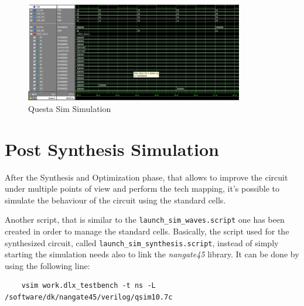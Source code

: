 \begin{figure}[H]   
	\centering
	\includegraphics[width=0.85\textwidth]{chapters/8_TestingVerification/images/simulation.png}
	\caption{Questa Sim Simulation}
	\label{fig:simulation}
\end{figure}

\section{Post Synthesis Simulation}
After the Synthesis and Optimization phase, that allows to improve the circuit under multiple points of view and perform the tech mapping, it's possible to simulate the behaviour of the circuit using the standard cells.

Another script, that is similar to the \texttt{launch\_sim\_waves.script} one has been created in order to manage the standard cells. Basically, the script used for the synthesized circuit, called \texttt{launch\_sim\_synthesis.script}, instead of simply starting the simulation needs also to link the \textit{nangate45} library. It can be done by using the following line:
\begin{lstlisting}
	vsim work.dlx_testbench -t ns -L /software/dk/nangate45/verilog/qsim10.7c 
\end{lstlisting}
